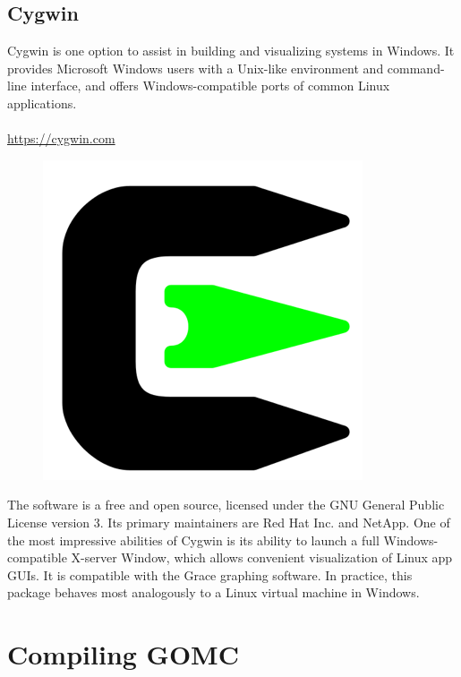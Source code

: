 \subsection{Cygwin}
Cygwin is one option to assist in building and visualizing systems in Windows. It provides Microsoft Windows users with a Unix-like environment and command-line interface, and offers Windows-compatible ports of common Linux applications.\\\\
\url{https://cygwin.com}
\begin{figure}[H]
\centering
\includegraphics[scale=0.6]{images/cygwin}
\end{figure}
The software is a free and open source, licensed under the GNU General Public License version 3. Its primary maintainers are Red Hat Inc. and NetApp. One of the most impressive abilities of Cygwin is its ability to launch a full Windows-compatible X-server Window, which allows convenient visualization of Linux app GUIs. It is compatible with the Grace graphing software. In practice, this package behaves most analogously to a Linux virtual machine in Windows.
\newpage
\section{Compiling GOMC}

